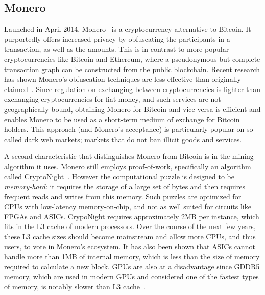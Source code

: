 \subsection{Monero}

Launched in April 2014, Monero~\cite{monero} is a cryptocurrency alternative to Bitcoin. It purportedly offers increased privacy by obfuscating the participants in a transaction, as well as the amounts. This is in contrast to more popular cryptocurrencies like Bitcoin and Ethereum, where a pseudonymous-but-complete transaction graph can be constructed from the public blockchain. Recent research has shown Monero's obfuscation techniques are less effective than originally claimed~\cite{MMLN17}.  Since regulation on exchanging between cryptocurrencies is lighter than exchanging cryptocurrencies for fiat money, and such services are not geographically bound, obtaining Monero for Bitcoin and vice versa is efficient and enables Monero to be used as a short-term medium of exchange for Bitcoin holders. This approach (and Monero's acceptance) is particularly popular on so-called dark web markets; markets that do not ban illicit goods and services.

A second characteristic that distinguishes Monero from Bitcoin is in the mining algorithm it uses. Monero still employs proof-of-work, specifically an algorithm called CryptoNight~\cite{cryptoknight}. However the computational puzzle is designed to be \textit{memory-hard}: it requires the storage of a large set of bytes and then requires frequent reads and writes from this memory. Such puzzles are optimized for CPUs with low-latency memory-on-chip, and not as well suited for circuits like FPGAs and ASICs. CrypoNight requires approximately 2MB per instance, which fits in the L3 cache of modern processors. Over the course of the next few years, these L3 cache sizes should become mainstream and allow more CPUs, and thus users, to vote in Monero's ecosystem. It has also been shown that ASICs cannot handle more than 1MB of internal memory, which is less than the size of memory required to calculate a new block. GPUs are also at a disadvantage since GDDR5 memory, which are used in modern GPUs and considered one of the fastest types of memory, is notably slower than L3 cache~\cite{van2013cryptonote}.  

%
%
%
%
%
%

